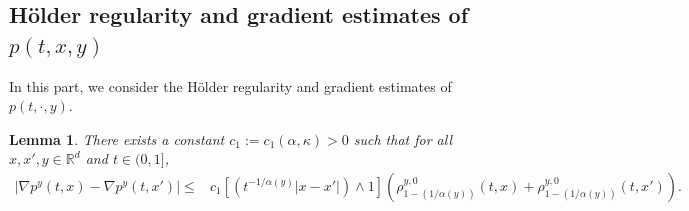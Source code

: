 \documentclass[a4paper,11pt]{amsart}
\renewcommand{\le}{\leqslant}
\newcommand{\R}{\mathds R}
\newcommand{\K}{\kappa}
\newcommand{\A}{\alpha}
\newtheorem{lemma}[theorem]{Lemma}
\theoremstyle{definition}
\begin{document}
\subsection{H\"{o}lder regularity and gradient estimates of $p(t,x,y)$}
In this part, we consider the H\"{o}lder regularity and gradient estimates of $p(t,\cdot,y)$.


\begin{lemma}\label{l4-4}
There exists a constant $c_1:=c_1(\A,\K)>0$ such that for all $x,x',y\in \R^d$ and $t \in (0,1]$,
\begin{equation}\label{l4-4-1}
\begin{split}
\left|\nabla p^y(t,x)-\nabla p^y(t,x')\right|\le &c_1
\left[\left(t^{-1/\A(y)}|x-x'|\right)\wedge 1\right]\left(
\rho^{y,0}_{1-(1/\A(y))}(t,x)+\rho^{y,0}_{1-(1/\A(y))}(t,x')\right).
\end{split}
\end{equation}
\end{lemma}
\end{document}
